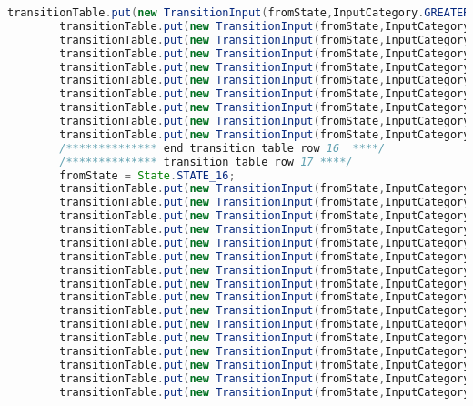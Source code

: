 \begin{lstlisting}[basicstyle=\miniscule,language=Java,caption=Implementation of transition table,label=listing:transition table]
		transitionTable.put(new TransitionInput(fromState,InputCategory.GREATER_THAN), State.STATE_18);
		transitionTable.put(new TransitionInput(fromState,InputCategory.PLUS), State.STATE_ERROR);
		transitionTable.put(new TransitionInput(fromState,InputCategory.HYPHEN_MINUS), State.STATE_ERROR);
		transitionTable.put(new TransitionInput(fromState,InputCategory.EQUAL), State.STATE_ERROR);
		transitionTable.put(new TransitionInput(fromState,InputCategory.EXCLAMATION_MARK), State.STATE_ERROR);
		transitionTable.put(new TransitionInput(fromState,InputCategory.DOT), State.STATE_ERROR);
		transitionTable.put(new TransitionInput(fromState,InputCategory.SINGLE_QUOTE), State.STATE_ERROR);
		transitionTable.put(new TransitionInput(fromState,InputCategory.PUNCT), State.STATE_ERROR);
		transitionTable.put(new TransitionInput(fromState,InputCategory.OTHER_PRINTABLE), State.STATE_ERROR);
		transitionTable.put(new TransitionInput(fromState,InputCategory.LINE_FEED), State.STATE_ERROR);
		/************** end transition table row 16  ****/
		/************** transition table row 17 ****/
		fromState = State.STATE_16;
		transitionTable.put(new TransitionInput(fromState,InputCategory.LETTER), State.STATE_ERROR);
		transitionTable.put(new TransitionInput(fromState,InputCategory.DIGIT), State.STATE_ERROR);
		transitionTable.put(new TransitionInput(fromState,InputCategory.UNDERSCORE), State.STATE_ERROR);
		transitionTable.put(new TransitionInput(fromState,InputCategory.SLASH_DIVIDE), State.STATE_ERROR);
		transitionTable.put(new TransitionInput(fromState,InputCategory.ASTERISK), State.STATE_ERROR);
		transitionTable.put(new TransitionInput(fromState,InputCategory.LESS_THAN), State.STATE_ERROR);
		transitionTable.put(new TransitionInput(fromState,InputCategory.GREATER_THAN), State.STATE_ERROR);
		transitionTable.put(new TransitionInput(fromState,InputCategory.PLUS), State.STATE_ERROR);
		transitionTable.put(new TransitionInput(fromState,InputCategory.HYPHEN_MINUS), State.STATE_ERROR);
		transitionTable.put(new TransitionInput(fromState,InputCategory.EQUAL), State.STATE_19);
		transitionTable.put(new TransitionInput(fromState,InputCategory.EXCLAMATION_MARK), State.STATE_ERROR);
		transitionTable.put(new TransitionInput(fromState,InputCategory.DOT), State.STATE_ERROR);
		transitionTable.put(new TransitionInput(fromState,InputCategory.SINGLE_QUOTE), State.STATE_ERROR);
		transitionTable.put(new TransitionInput(fromState,InputCategory.PUNCT), State.STATE_ERROR);
		transitionTable.put(new TransitionInput(fromState,InputCategory.OTHER_PRINTABLE), State.STATE_ERROR);
		transitionTable.put(new TransitionInput(fromState,InputCategory.LINE_FEED), State.STATE_ERROR);

\end{lstlisting}
